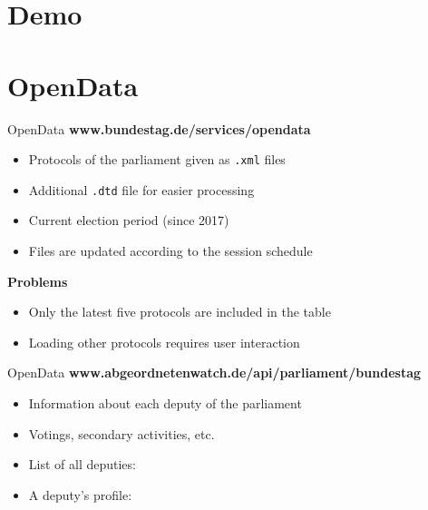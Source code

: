 \documentclass{beamer}
\begin{document}
  \section{Demo}

  \section{OpenData}
  \begin{frame}[plain]{OpenData}
    \textbf{\faAt}\quad\textbf{www.bundestag.de/services/opendata}
    \begin{itemize}
      \item Protocols of the parliament given as \texttt{.xml} files
      \item Additional \texttt{.dtd} file for easier processing
      \item Current election period (since 2017)
      \item Files are updated according to the session schedule
    \end{itemize}
    \textbf{\faExclamationTriangle}\quad\textbf{Problems}
    \begin{itemize}
      \item Only the latest five protocols are included in the table
      \item Loading other protocols requires user interaction
    \end{itemize}  
  \end{frame}

  \begin{frame}[plain]{OpenData}
    \textbf{\faAt}\quad\textbf{www.abgeordnetenwatch.de/api/parliament/bundestag}
    \begin{itemize}
      \item Information about each deputy of the parliament
      \item Votings, secondary activities, etc.
      \item List of all deputies:  
      \item A deputy's profile: 
    \end{itemize}
  \end{frame}
\end{document}
